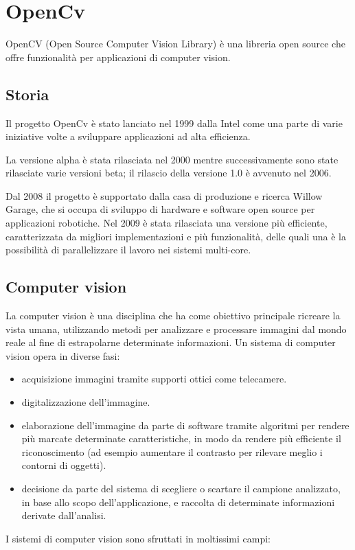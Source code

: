 

\section{OpenCv}
OpenCV (Open Source Computer Vision Library) è una libreria open source che offre funzionalità per applicazioni di computer vision.

\subsection{Storia}
Il progetto OpenCv è stato lanciato nel 1999 dalla Intel come una parte di varie iniziative volte a sviluppare applicazioni ad alta efficienza.\cite{opencv1}

La versione alpha è stata rilasciata nel 2000 mentre successivamente sono state rilasciate varie versioni beta; il rilascio della versione 1.0 è avvenuto
nel 2006.

Dal 2008 il progetto è supportato dalla casa di produzione e ricerca Willow Garage, che si occupa di sviluppo di hardware e software open source per applicazioni robotiche. Nel 2009 è stata rilasciata una versione più efficiente, caratterizzata da migliori implementazioni e più funzionalità, delle quali una è la possibilità di parallelizzare il lavoro nei sistemi multi-core.

\subsection{Computer vision}

La computer vision è una disciplina che ha come obiettivo principale ricreare la vista umana, utilizzando metodi per analizzare e processare immagini dal mondo reale al fine di estrapolarne determinate informazioni. Un sistema di computer vision opera in diverse fasi:
\begin{itemize}
\item acquisizione immagini tramite supporti ottici come telecamere.
\item digitalizzazione dell'immagine.
\item elaborazione dell'immagine da parte di software tramite algoritmi per rendere più marcate determinate caratteristiche, in modo da rendere più efficiente il riconoscimento (ad esempio aumentare il contrasto per rilevare meglio i contorni di oggetti).
\item decisione da parte del sistema di scegliere o scartare il campione analizzato, in base allo scopo dell'applicazione, e raccolta di determinate informazioni derivate dall'analisi.
\end{itemize}
I sistemi di computer vision sono sfruttati in moltissimi campi:

